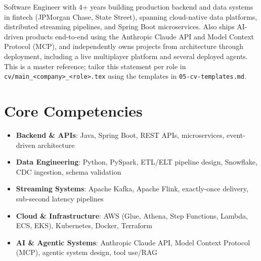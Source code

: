 \documentclass[11pt,a4paper,sans]{moderncv}
\begin{document}
\makecvtitle


\vspace{6pt}
\small{Software Engineer with 4+ years building production backend and data systems in fintech (JPMorgan Chase, State Street), spanning cloud-native data platforms, distributed streaming pipelines, and Spring Boot microservices. Also ships AI-driven products end-to-end using the Anthropic Claude API and Model Context Protocol (MCP), and independently owns projects from architecture through deployment, including a live multiplayer platform and several deployed agents. This is a master reference; tailor this statement per role in \texttt{cv/main\_\textless{}company\textgreater{}\_\textless{}role\textgreater{}.tex} using the templates in \texttt{05-cv-templates.md}.}


\section{Core Competencies}
\vspace{1pt}
\begin{itemize}

\item \textbf{Backend \& APIs}: Java, Spring Boot, REST APIs, microservices, event-driven architecture

\item \textbf{Data Engineering}: Python, PySpark, ETL/ELT pipeline design, Snowflake, CDC ingestion, schema validation

\item \textbf{Streaming Systems}: Apache Kafka, Apache Flink, exactly-once delivery, sub-second latency pipelines

\item \textbf{Cloud \& Infrastructure}: AWS (Glue, Athena, Step Functions, Lambda, ECS, EKS), Kubernetes, Docker, Terraform

\item \textbf{AI \& Agentic Systems}: Anthropic Claude API, Model Context Protocol (MCP), agentic system design, tool use/RAG

\end{itemize}
\end{document}
